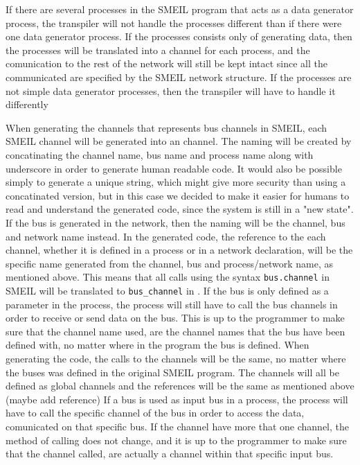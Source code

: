 If there are several processes in the SMEIL program that acts as a data generator process, the transpiler will not handle the processes different than if there were one data generator process. If the processes consists only of generating data, then the processes will be translated into a \cspm channel for each process, and the comunication to the rest of the network will still be kept intact since all the communicated are specified by the SMEIL network structure.
If the processes are not simple data generator processes, then the transpiler will have to handle it differently %



When generating the channels that represents bus channels in SMEIL, each SMEIL channel will be generated into an \cspm channel.
The naming will be created by concatinating the channel name, bus name and process name along with underscore in order to generate human readable code. It would also be possible simply to generate a unique string, which might give more security than using a concatinated version, but in this case we decided to make it easier for humans to read and understand the generated code, since the system is still in a "new state".
If the bus is generated in the network, then the naming will be the channel, bus and network name instead.
In the generated \cspm code, the reference to the each channel, whether it is defined in a process or in a network declaration, will be the specific name generated from the channel, bus and process/network name, as mentioned above. This means that all calls using the syntax \texttt{bus.channel} in SMEIL will be translated to \texttt{bus\_channel} in \cspm.
If the bus is only defined as a parameter in the process, the process will still have to call the bus channels in order to receive or send data on the bus. This is up to the programmer to make sure that the channel name used, are the channel names that the bus have been defined with, no matter where in the program the bus is defined. When generating the \cspm code, the calls to the channels will be the same, no matter where the buses was defined in the original SMEIL program. The channels will all be defined as global channels and the references will be the same as mentioned above (maybe add reference)
If a bus is used as input bus in a process, the process will have to call the specific channel of the bus in order to access the data, comunicated on that specific bus. If the channel have more that one channel, the method of calling does not change, and it is up to the programmer to make sure that the channel called, are actually a channel within that specific input bus.

